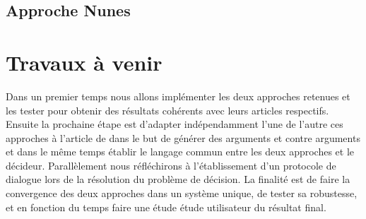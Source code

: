 \documentclass[a4paper, 11pt]{article}
\renewcommand{\textbf}[1]{\begingroup\bfseries\mathversion{bold}#1\endgroup}
\begin{document}
\subsection{Approche Nunes}

\begin{comment}
\noindent \textbf{Modèle} \\

\noindent \textbf{Arguments} \\

\noindent \textbf{Génération des arguments}  \\

\noindent \textbf{Résultats expérimentaux}   \\

\end{comment}

\section{Travaux à venir}

Dans un premier temps nous allons implémenter les deux approches retenues et les tester pour obtenir des résultats cohérents avec leurs articles respectifs. Ensuite la prochaine étape est d'adapter indépendamment l'une de l'autre ces approches à l'article de\textcolor{blue}{\citep{DBLP}} dans le but de générer des arguments et contre arguments et dans le même temps établir le langage commun entre les deux approches et le décideur. Parallèlement nous réfléchirons à l'établissement d'un protocole de dialogue lors de la résolution du problème de décision. La finalité est de faire la convergence des deux approches dans un système unique, de tester sa robustesse, et en fonction du temps faire une étude étude utilisateur du résultat final.


\end{document}

